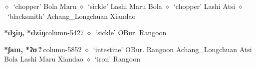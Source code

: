 \hspace{1ex}
         $\diamond$~`chopper'
         Bola 
\hspace{1ex}
         Maru 
\hspace{1ex}
         $\diamond$~`sickle'
         Lashi 
\hspace{1ex}
         Maru 
\hspace{1ex}
         Bola 
\hspace{1ex}
         $\diamond$~`chopper'
         Lashi 
\hspace{1ex}
         Atsi 
\hspace{1ex}
         $\diamond$~`blacksmith'
         Achang\_Longchuan 
\hspace{1ex}
         Xiandao 
  \item {\footnotesize \textbf{*dʒiŋ, *dziŋ}}{\tiny column-5427}
         $\diamond$~`sickle'
         OBur. 
\hspace{1ex}
         Rangoon 
  \item {\footnotesize \textbf{*ʃam, *ʔʊ\,?\,}}{\tiny column-5852}
         $\diamond$~`intestine'
         OBur. 
\hspace{1ex}
         Rangoon 
\hspace{1ex}
         Achang\_Longchuan 
\hspace{1ex}
         Atsi 
\hspace{1ex}
         Bola 
\hspace{1ex}
         Lashi 
\hspace{1ex}
         Maru 
\hspace{1ex}
         Xiandao 
\hspace{1ex}
         $\diamond$~`iron'
         Rangoon 
\hspace{1ex}

